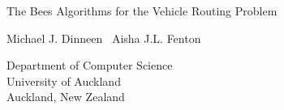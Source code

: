 

\begin{titlepage}


\LARGE
\begin{flushleft}
The Bees Algorithms for the Vehicle Routing Problem
\end{flushleft}

\normalsize
\begin{flushleft}
Michael J. Dinneen \ Aisha J.L. Fenton
\end{flushleft}

\vfill
\rmfamily
\begin{flushright}
Department of Computer Science\\
University of Auckland \\
Auckland, New Zealand 
\end{flushright}

\end{titlepage}
